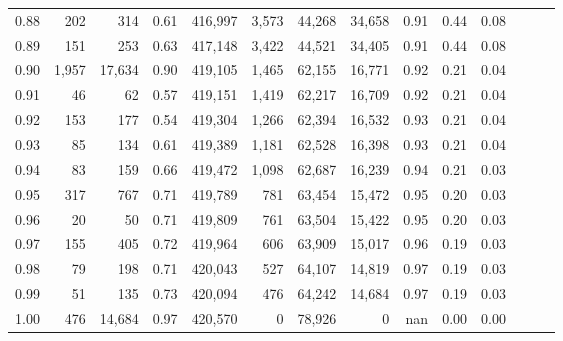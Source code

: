\begin{tabular}{rrrrrrrrrrrrrr}
0.88 &     202 &     314 &  0.61 &  416,997 &    3,573 &  44,268 &  34,658 &  0.91 &  0.44 &      0.08 \\
0.89 &     151 &     253 &  0.63 &  417,148 &    3,422 &  44,521 &  34,405 &  0.91 &  0.44 &      0.08 \\
0.90 &   1,957 &  17,634 &  0.90 &  419,105 &    1,465 &  62,155 &  16,771 &  0.92 &  0.21 &      0.04 \\
0.91 &      46 &      62 &  0.57 &  419,151 &    1,419 &  62,217 &  16,709 &  0.92 &  0.21 &      0.04 \\
0.92 &     153 &     177 &  0.54 &  419,304 &    1,266 &  62,394 &  16,532 &  0.93 &  0.21 &      0.04 \\
0.93 &      85 &     134 &  0.61 &  419,389 &    1,181 &  62,528 &  16,398 &  0.93 &  0.21 &      0.04 \\
0.94 &      83 &     159 &  0.66 &  419,472 &    1,098 &  62,687 &  16,239 &  0.94 &  0.21 &      0.03 \\
0.95 &     317 &     767 &  0.71 &  419,789 &      781 &  63,454 &  15,472 &  0.95 &  0.20 &      0.03 \\
0.96 &      20 &      50 &  0.71 &  419,809 &      761 &  63,504 &  15,422 &  0.95 &  0.20 &      0.03 \\
0.97 &     155 &     405 &  0.72 &  419,964 &      606 &  63,909 &  15,017 &  0.96 &  0.19 &      0.03 \\
0.98 &      79 &     198 &  0.71 &  420,043 &      527 &  64,107 &  14,819 &  0.97 &  0.19 &      0.03 \\
0.99 &      51 &     135 &  0.73 &  420,094 &      476 &  64,242 &  14,684 &  0.97 &  0.19 &      0.03 \\
1.00 &     476 &  14,684 &  0.97 &  420,570 &        0 &  78,926 &       0 &   nan &  0.00 &      0.00 \\
\bottomrule
\end{tabular}

